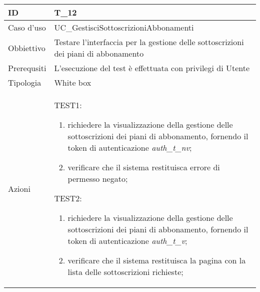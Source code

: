 \begin{table}[hb]
    \centering
    \begin{tabular}{ |p{2cm}|p{10cm}|  }
        \hline
        ID          & T\_12                                                                               \\\hline
        Caso d'uso  & UC\_GestisciSottoscrizioniAbbonamenti                                               \\\hline
        Obbiettivo  & Testare l'interfaccia per la gestione delle sottoscrizioni dei piani di abbonamento \\\hline
        Prerequsiti & L'esecuzione del test è effettuata con privilegi di Utente                          \\\hline
        Tipologia   & White box                                                                           \\\hline
        Azioni      &
        TEST1:
        \begin{enumerate}[nosep, topsep=0pt]
            \item richiedere la visualizzazione della gestione delle sottoscrizioni dei piani di abbonamento, fornendo il token di autenticazione \emph{auth\_t\_nv};
            \item verificare che il sistema restituisca errore di permesso negato;
        \end{enumerate}
        \vspace{0.5cm} TEST2:
        \begin{enumerate}[nosep, topsep=0pt]
            \item richiedere la visualizzazione della gestione delle sottoscrizioni dei piani di abbonamento, fornendo il token di autenticazione \emph{auth\_t\_v};
            \item verificare che il sistema restituisca la pagina con la lista delle sottoscrizioni richieste;
        \end{enumerate}
        \\\hline
    \end{tabular}
\end{table}

